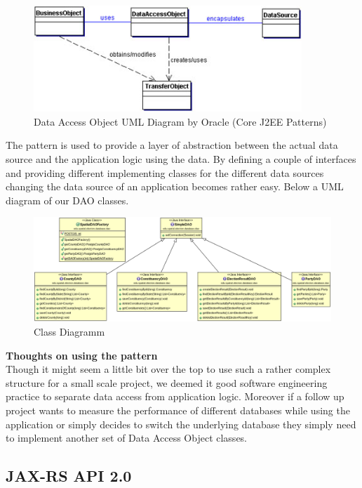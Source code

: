 \begin{figure}[htbp]
\centering
\includegraphics[width=0.9\textwidth]{../img/146804.jpg}
\caption{Data Access Object UML Diagram by Oracle (Core J2EE Patterns)}
\end{figure}

The pattern is used to provide a layer of abstraction between the actual
data source and the application logic using the data. By defining a
couple of interfaces and providing different implementing classes for
the different data sources changing the data source of an application
becomes rather easy. Below a UML diagram of our DAO classes.

\begin{figure}[htbp]
\centering
\includegraphics[width=1.2\textwidth]{../img/6CeJf06.png}
\caption{Class Diagramm}
\end{figure}

\textbf{Thoughts on using the pattern}\\Though it might seem a little
bit over the top to use such a rather complex structure for a small
scale project, we deemed it good software engineering practice to
separate data access from application logic. Moreover if a follow up
project wants to measure the performance of different databases while
using the application or simply decides to switch the underlying
database they simply need to implement another set of Data Access Object
classes.

\newpage
\subsection{JAX-RS API 2.0}\label{jax-rs-api-2.0}

